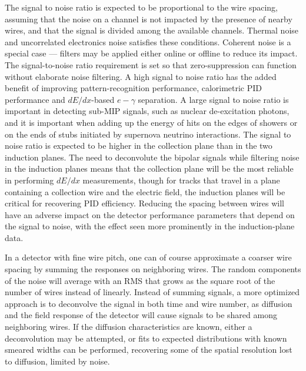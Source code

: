The signal to noise ratio is expected to be proportional to the wire
spacing, assuming that the noise on a channel is not impacted by the
presence of nearby wires, and that the signal is divided among the
available channels.  Thermal noise and uncorrelated electronics noise
satisfies these conditions.  Coherent noise is a special case ---
filters may be applied either online or offline to reduce its impact.
The signal-to-noise ratio requirement is set so that zero-suppression
can function without elaborate noise filtering.  A high signal to
noise ratio has the added benefit of improving pattern-recognition
performance, calorimetric PID performance and $dE/dx$-based
$e-\gamma$ separation.  A large signal to noise ratio is important in
detecting sub-MIP signals, such as nuclear de-excitation photons, and
it is important when adding up the energy of hits on the edges of
showers or on the ends of stubs initiated by supernova neutrino
interactions.  The signal to noise ratio is expected to be higher in
the collection plane than in the two induction planes.  The need to
deconvolute the bipolar signals while filtering noise in the induction
planes means that the collection plane will be the most reliable in
performing $dE/dx$ measurements, though for tracks that travel in a
plane containing a collection wire and the electric field, the
induction planes will be critical for recovering PID efficiency.
Reducing the spacing between wires will have an adverse impact on the
detector performance parameters that depend on the signal to noise,
with the effect seen more prominently in the induction-plane data.

In a detector with fine wire pitch, one can of course approximate a
coarser wire spacing by summing the responses on neighboring wires.
The random components of the noise will average with an RMS that grows
as the square root of the number of wires instead of linearly.
Instead of summing signals, a more optimized approach is to deconvolve
the signal in both time and wire number, as diffusion and the field
response of the detector will cause signals to be shared among
neighboring wires.  If the diffusion characteristics are known, either
a deconvolution may be attempted, or fits to expected distributions
with known smeared widths can be performed, recovering some of the
spatial resolution lost to diffusion, limited by noise.

